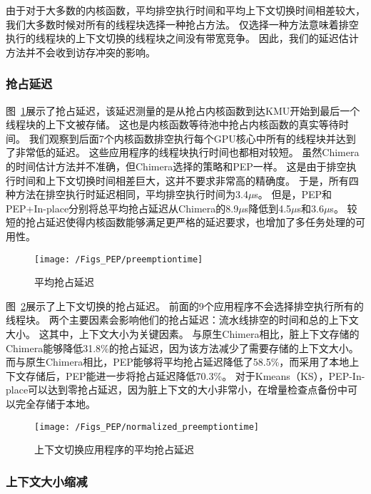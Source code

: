 由于对于大多数的内核函数，平均排空执行时间和平均上下文切换时间相差较大，我们大多数时候对所有的线程块选择一种抢占方法。
仅选择一种方法意味着排空执行的线程块的上下文切换的线程块之间没有带宽竞争。
因此，我们的延迟估计方法并不会收到访存冲突的影响。

\subsubsection{抢占延迟}

图~\ref{fig:preemptiontime}展示了抢占延迟，该延迟测量的是从抢占内核函数到达KMU开始到最后一个线程块的上下文被存储。
这也是内核函数等待池中抢占内核函数的真实等待时间。
我们观察到后面7个内核函数排空执行每个GPU核心中所有的线程块并达到了非常低的延迟。
这些应用程序的线程块执行时间也都相对较短。
虽然Chimera的时间估计方法并不准确，但Chimera选择的策略和PEP一样。
这是由于排空执行时间和上下文切换时间相差巨大，这并不要求非常高的精确度。
于是，所有四种方法在排空执行时延迟相同，平均排空执行时间为3.4$\mu$s。
但是，PEP和PEP+In-place分别将总平均抢占延迟从Chimera的8.9$\mu$s降低到4.5$\mu$s和3.6$\mu$s。
较短的抢占延迟使得内核函数能够满足更严格的延迟要求，也增加了多任务处理的可用性。

\begin{figure}[htbp] %
  \centering
  \texttt{[image: /Figs\_PEP/preemptiontime]}
  \caption{平均抢占延迟}
  \label{fig:preemptiontime}
\end{figure}


图~\ref{fig:normalized_preemptiontime}展示了上下文切换的抢占延迟。
前面的9个应用程序不会选择排空执行所有的线程块。
两个主要因素会影响他们的抢占延迟：流水线排空的时间和总的上下文大小。
这其中，上下文大小为关键因素。
与原生Chimera相比，脏上下文存储的Chimera能够降低31.8\%的抢占延迟，因为该方法减少了需要存储的上下文大小。
而与原生Chimera相比，PEP能够将平均抢占延迟降低了58.5\%，而采用了本地上下文存储后，PEP能进一步将抢占延迟降低70.3\%。
对于Kmeans（KS），PEP-In-place可以达到零抢占延迟，因为脏上下文的大小非常小，在增量检查点备份中可以完全存储于本地。

\begin{figure}[htbp] %
  \centering
  \texttt{[image: /Figs\_PEP/normalized\_preemptiontime]}
  \caption{上下文切换应用程序的平均抢占延迟}
  \label{fig:normalized_preemptiontime}
\end{figure}

\subsubsection{上下文大小缩减}

